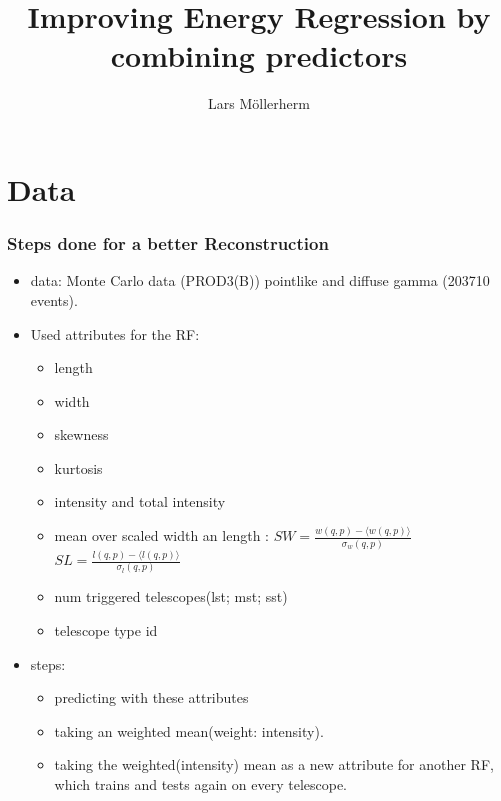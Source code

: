\documentclass[aspectratio=1610, professionalfonts, 9pt]{beamer}
\title{Improving Energy Regression by combining predictors}
\author[L.~Möllerherm]{Lars Möllerherm}
\institute[Experimentelle Physik Vb]{Experimentelle Physik Vb \\  Fakultät Physik}
\begin{document}
\maketitle

\section{Data}
  \begin{frame}
    \frametitle{Steps done for a better Reconstruction}
    \begin{itemize}
      \item data: Monte Carlo data (PROD3(B)) \- pointlike and diffuse gamma (203710 events).

      \item Used attributes for the RF:
      \begin{itemize}
        \item length
        \item width
        \item skewness
        \item kurtosis
        \item intensity and total intensity
        \item mean over scaled width an length \cite[104]{HESS}: $SW =\frac{w(q,p)-\langle w(q,p) \rangle}{\sigma_w(q,p)}$  $SL = \frac{l(q,p)-\langle l(q,p) \rangle}{\sigma_l(q,p)}$
        \item num triggered telescopes(lst; mst; sst)
        \item telescope type id
      \end{itemize}

      \item steps:
      \begin{itemize}
        \item predicting with these attributes
        \item taking an weighted mean(weight: intensity).
        \item taking the weighted(intensity) mean as a new attribute for another RF, which trains and tests again on every telescope.
      \end{itemize}
    \end{itemize}

  \end{frame}
\end{document}
